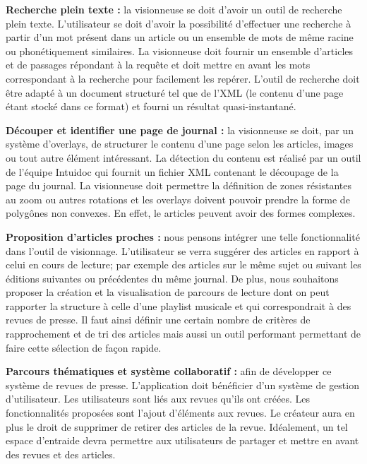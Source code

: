     \textbf{Recherche plein texte :} la visionneuse se doit d’avoir un outil de recherche plein texte. L’utilisateur se doit d’avoir la possibilité
    d’effectuer une recherche à partir d’un mot présent dans un article ou un ensemble de mots de même racine ou phonétiquement similaires.
    La visionneuse doit fournir un ensemble d’articles et de passages répondant à la requête et doit mettre en avant les mots correspondant à la recherche pour facilement les repérer.
    L’outil de recherche doit être adapté à un document structuré tel que de l’XML (le contenu d’une page étant stocké dans ce format) et fourni
    un résultat quasi-instantané.


    \textbf{Découper et identifier une page de journal :} la visionneuse se doit, par un système d’overlays, de structurer le contenu d’une page selon
    les articles, images ou tout autre élément intéressant. La détection du contenu est réalisé par un outil de l’équipe Intuidoc qui fournit un
    fichier XML contenant le découpage de la page du journal. La visionneuse doit permettre la définition de zones résistantes au zoom ou autres
    rotations et les overlays doivent pouvoir prendre la forme de polygônes non convexes. En effet, le articles peuvent avoir des formes complexes.


    \textbf{Proposition d’articles proches :} nous pensons intégrer une telle fonctionnalité dans l’outil de visionnage. L'utilisateur se verra
    suggérer des articles en rapport à celui en cours de lecture; par exemple des articles sur le même sujet ou suivant les éditions suivantes ou précédentes
    du même journal. De plus, nous souhaitons proposer la création et la visualisation de parcours de lecture dont on peut rapporter la structure
    à celle d’une playlist musicale et qui correspondrait à des revues de presse. Il faut ainsi définir une certain nombre de critères de rapprochement
    et de tri des articles mais aussi un outil performant permettant de faire cette sélection de façon rapide.


    \textbf{Parcours thématiques et système collaboratif :} afin de développer ce système de revues de presse. L’application doit bénéficier d’un
    système de gestion d’utilisateur. Les utilisateurs sont liés aux revues qu’ils ont créées. Les fonctionnalités proposées sont l’ajout d'éléments
    aux revues. Le créateur aura en plus le droit de supprimer de retirer des articles de la revue. Idéalement, un tel espace d’entraide devra permettre
    aux utilisateurs de partager et mettre en avant des revues et des articles.
